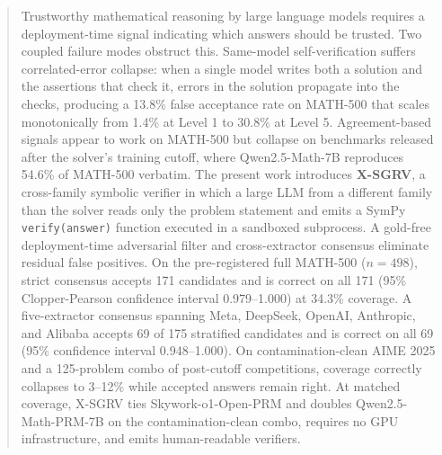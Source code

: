 \documentclass{article}
\begin{document}

\printAffiliationsAndNotice{}

\begin{abstract}
Trustworthy mathematical reasoning by large language models requires a deployment-time signal indicating which answers should be trusted. Two coupled failure modes obstruct this. Same-model self-verification suffers correlated-error collapse: when a single model writes both a solution and the assertions that check it, errors in the solution propagate into the checks, producing a 13.8\% false acceptance rate on MATH-500 that scales monotonically from 1.4\% at Level 1 to 30.8\% at Level 5. Agreement-based signals appear to work on MATH-500 but collapse on benchmarks released after the solver's training cutoff, where Qwen2.5-Math-7B reproduces 54.6\% of MATH-500 verbatim. The present work introduces \textbf{X-SGRV}, a cross-family symbolic verifier in which a large LLM from a different family than the solver reads only the problem statement and emits a SymPy \texttt{verify(answer)} function executed in a sandboxed subprocess. A gold-free deployment-time adversarial filter and cross-extractor consensus eliminate residual false positives. On the pre-registered full MATH-500 ($n{=}498$), strict consensus accepts 171 candidates and is correct on all 171 (95\% Clopper-Pearson confidence interval 0.979--1.000) at 34.3\% coverage. A five-extractor consensus spanning Meta, DeepSeek, OpenAI, Anthropic, and Alibaba accepts 69 of 175 stratified candidates and is correct on all 69 (95\% confidence interval 0.948--1.000). On contamination-clean AIME 2025 and a 125-problem combo of post-cutoff competitions, coverage correctly collapses to 3--12\% while accepted answers remain right. At matched coverage, X-SGRV ties Skywork-o1-Open-PRM and doubles Qwen2.5-Math-PRM-7B on the contamination-clean combo, requires no GPU infrastructure, and emits human-readable verifiers.
\end{abstract}
\end{document}
